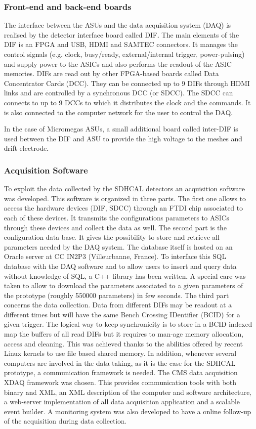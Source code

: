 \subsubsection{Front-end and back-end boards}

The interface between the ASUs and the data acquisition system (DAQ) is realised
by the detector interface board called DIF. The main elements of the DIF is an
FPGA and USB, HDMI and SAMTEC connectors. It manages the control signals
(e.g. clock, busy/ready, external/internal trigger, power-pulsing) and
supply power to the ASICs and also performs the readout of the ASIC memories.
DIFs are read out by other FPGA-based boards called Data Concentrator Cards
(DCC). They can be connected up to 9 DIFs through HDMI links and are controlled
by a synchronous DCC (or SDCC). The SDCC can connects to up to 9 DCCs to which
it distributes the clock and the commands. It is also connected to the computer
network for the user to control the DAQ.

In the case of Micromegas ASUs, a small additional board called inter-DIF is
used between the DIF and ASU to provide the high voltage to the meshes and drift
electrode.


\subsubsection{Acquisition Software}

To exploit the data collected by the SDHCAL detectors an acquisition software
was developed. This software is organized in three parts. The first one allows
to access the hardware devices (DIF, SDCC) through an FTDI chip associated to
each of these devices. It transmits the configurations parameters to ASICs
through these devices and collect the data as well. The second part is the
configuration data base. It gives the possibility to store and retrieve all
parameters needed by the DAQ system. The database itself is hosted on an Oracle
server at CC IN2P3 (Villeurbanne, France). To interface this SQL database with
the DAQ software and to allow users to insert and query data without knowledge
of SQL, a C++ library has been written. A special care was taken to allow to
download the parameters associated to a given parameters of the prototype
(roughly 550000 parameters) in few seconds. The third part concerns the data
collection. Data from different DIFs may be readout at a different times but
will have the same Bench Crossing IDentifier (BCID) for a given trigger. The
logical way to keep synchronicity is to store in a BCID indexed map the buffers
of all read DIFs but it requires to man-age memory allocation, access and
cleaning. This was achieved thanks to the abilities offered by recent Linux
kernels to use file based shared memory. In addition, whenever several
computers are involved in the data taking, as it is the case for the SDHCAL
prototype, a communication framework is needed. The CMS data acquisition XDAQ
framework was chosen. This provides communication tools with both binary and
XML, an XML description of the computer and software architecture, a web-server
implementation of all data acquisition application and a scalable event builder.
A monitoring system was also developed to have a online follow-up of the
acquisition during data collection.

